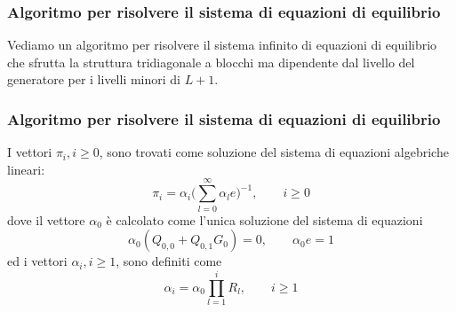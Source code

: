 \documentclass{beamer}
\begin{document}

\begin{frame}
    \frametitle{Algoritmo per risolvere il sistema di equazioni di equilibrio}
    \begin{block}{}
            Vediamo un algoritmo per risolvere il sistema infinito di equazioni di equilibrio che sfrutta la struttura tridiagonale a blocchi ma dipendente dal livello del generatore per i livelli minori di $L + 1$.
    \end{block}
\end{frame}


\begin{frame}
    \frametitle{Algoritmo per risolvere il sistema di equazioni di equilibrio}
    \begin{theorem}
        I vettori $\pi_i, i \geq 0$, sono trovati come soluzione del sistema di equazioni algebriche lineari:
        \begin{equation*}
            \pi_i = \alpha_i \big( \sum_{l=0}^\infty \alpha_l e \big)^{-1}, \qquad i \geq 0
        \end{equation*}
        dove il vettore $\alpha_0$ è calcolato come l'unica soluzione del sistema di equazioni
        \begin{equation*}
            \alpha_0(Q_{0,0} + Q_{0,1}G_0) = 0, \qquad \alpha_0e = 1
        \end{equation*}
        ed i vettori $\alpha_i, i \geq 1$, sono definiti come
        \begin{equation*}
            \alpha_i = \alpha_0 \prod_{l=1}^i R_l, \qquad i \geq 1
        \end{equation*}
    \end{theorem}
\end{frame}
\end{document}
